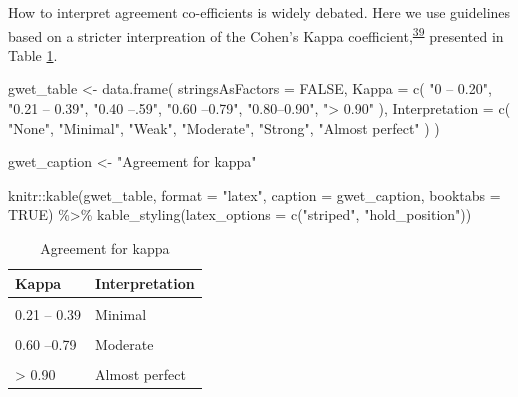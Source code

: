 \documentclass[a4paper, twoside]{templates/ociamthesis}
\newenvironment{Shaded}{\begin{snugshade}}{\end{snugshade}}
\newcommand{\AttributeTok}[1]{\textcolor[rgb]{0.77,0.63,0.00}{#1}}
\newcommand{\ConstantTok}[1]{\textcolor[rgb]{0.00,0.00,0.00}{#1}}
\newcommand{\FunctionTok}[1]{\textcolor[rgb]{0.00,0.00,0.00}{#1}}
\newcommand{\NormalTok}[1]{#1}
\newcommand{\OtherTok}[1]{\textcolor[rgb]{0.56,0.35,0.01}{#1}}
\newcommand{\SpecialCharTok}[1]{\textcolor[rgb]{0.00,0.00,0.00}{#1}}
\newcommand{\StringTok}[1]{\textcolor[rgb]{0.31,0.60,0.02}{#1}}
\renewenvironment{Shaded}
{
  \vspace{4pt}%
  \begin{snugshade}%
}{%
  \end{snugshade}%
  \vspace{4pt}%
}
\begin{document}
How to interpret agreement co-efficients is widely debated. Here we use guidelines based on a stricter interpreation of the Cohen's Kappa coefficient,\textsuperscript{\protect\hyperlink{ref-mchugh2012}{39}} presented in Table \ref{tab:gwet-table}.

\begin{Shaded}
\begin{Highlighting}[]
\NormalTok{gwet\_table }\OtherTok{\textless{}{-}} \FunctionTok{data.frame}\NormalTok{(}
  \AttributeTok{stringsAsFactors =} \ConstantTok{FALSE}\NormalTok{,}
  \AttributeTok{Kappa =} \FunctionTok{c}\NormalTok{(}
    \StringTok{"0 – 0.20"}\NormalTok{,}
    \StringTok{"0.21 – 0.39"}\NormalTok{,}
    \StringTok{"0.40 –.59"}\NormalTok{,}
    \StringTok{"0.60 –0.79"}\NormalTok{,}
    \StringTok{"0.80–0.90"}\NormalTok{,}
    \StringTok{"\textgreater{} 0.90"}
\NormalTok{  ),}
  \AttributeTok{Interpretation =} \FunctionTok{c}\NormalTok{(}
    \StringTok{"None"}\NormalTok{,}
    \StringTok{"Minimal"}\NormalTok{,}
    \StringTok{"Weak"}\NormalTok{,}
    \StringTok{"Moderate"}\NormalTok{,}
    \StringTok{"Strong"}\NormalTok{,}
    \StringTok{"Almost perfect"}
\NormalTok{  )}
\NormalTok{)}

\NormalTok{gwet\_caption }\OtherTok{\textless{}{-}} \StringTok{"Agreement for kappa"}
\end{Highlighting}
\end{Shaded}

\begin{Shaded}
\begin{Highlighting}[]
\NormalTok{knitr}\SpecialCharTok{::}\FunctionTok{kable}\NormalTok{(gwet\_table, }\AttributeTok{format =} \StringTok{"latex"}\NormalTok{, }\AttributeTok{caption =}\NormalTok{ gwet\_caption, }\AttributeTok{booktabs =} \ConstantTok{TRUE}\NormalTok{) }\SpecialCharTok{\%\textgreater{}\%} 
  \FunctionTok{kable\_styling}\NormalTok{(}\AttributeTok{latex\_options =} \FunctionTok{c}\NormalTok{(}\StringTok{"striped"}\NormalTok{, }\StringTok{"hold\_position"}\NormalTok{))}
\end{Highlighting}
\end{Shaded}

\begin{table}[!h]

\caption{\label{tab:gwet-table}Agreement for kappa}
\centering
\begin{tabular}[t]{ll}
\toprule
Kappa & Interpretation\\
\midrule
\cellcolor{gray!6}{0 – 0.20} & \cellcolor{gray!6}{None}\\
0.21 – 0.39 & Minimal\\
\cellcolor{gray!6}{0.40 –.59} & \cellcolor{gray!6}{Weak}\\
0.60 –0.79 & Moderate\\
\cellcolor{gray!6}{0.80–0.90} & \cellcolor{gray!6}{Strong}\\
\addlinespace
> 0.90 & Almost perfect\\
\bottomrule
\end{tabular}
\end{table}
\end{document}
